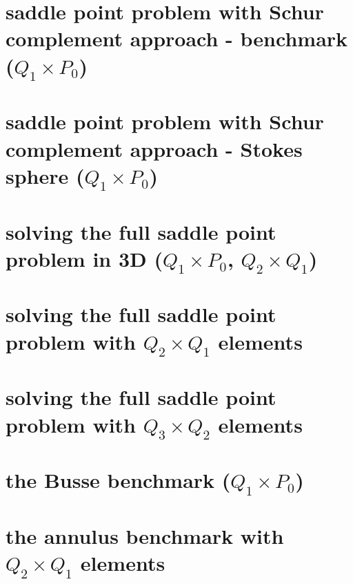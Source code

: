 \documentclass[a4paper,11pt]{report}
\begin{document}
\chapter{saddle point problem with Schur complement approach - benchmark ($Q_1\times P_0$)\label{f15}} %

\chapter{saddle point problem with Schur complement approach - Stokes sphere ($Q_1\times P_0$) \label{f16}} %

\chapter{solving the full saddle point problem in 3D ($Q_1\times P_0$, $Q_2\times Q_1$)\label{f17}} %

\chapter{solving the full saddle point problem with $Q_2\times Q_1$ elements \label{f18}} %

\chapter{solving the full saddle point problem with $Q_3\times Q_2$ elements \label{f19}} %

\chapter{the Busse benchmark ($Q_1\times P_0$) \label{f20}} %

\chapter{the annulus benchmark with $Q_2\times Q_1$ elements \label{f21}} %
\end{document}
